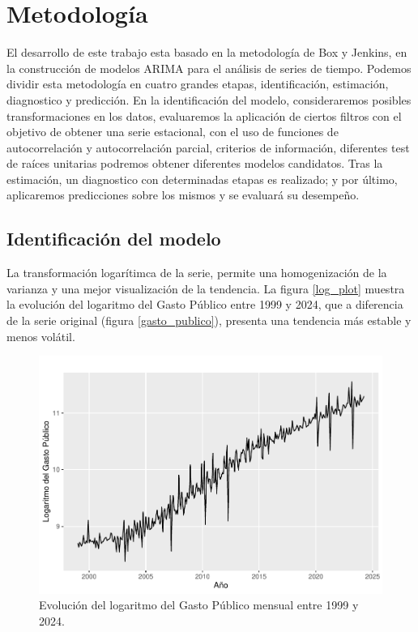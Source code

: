 \documentclass[
  12pt,
]{article}
\begin{document}
\hypertarget{metodologia}{%
\section{Metodología}\label{metodologia}}

El desarrollo de este trabajo esta basado en la metodología de Box y
Jenkins, en la construcción de modelos ARIMA para el análisis de series
de tiempo. Podemos dividir esta metodología en cuatro grandes etapas,
identificación, estimación, diagnostico y predicción. En la
identificación del modelo, consideraremos posibles transformaciones en
los datos, evaluaremos la aplicación de ciertos filtros con el objetivo
de obtener una serie estacional, con el uso de funciones de
autocorrelación y autocorrelación parcial, criterios de información,
diferentes test de raíces unitarias podremos obtener diferentes modelos
candidatos. Tras la estimación, un diagnostico con determinadas etapas
es realizado; y por último, aplicaremos predicciones sobre los mismos y
se evaluará su desempeño.

\hypertarget{identificaciuxf3n-del-modelo}{%
\subsection{Identificación del
modelo}\label{identificaciuxf3n-del-modelo}}

La transformación logarítimca de la serie, permite una homogenización de
la varianza y una mejor visualización de la tendencia. La figura
\ref{log_plot} muestra la evolución del logaritmo del Gasto Público
entre 1999 y 2024, que a diferencia de la serie original (figura
\ref{gasto_publico}), presenta una tendencia más estable y menos
volátil.

\begin{figure}[H]

{\centering \includegraphics[width=0.75\linewidth]{informe_files/figure-latex/log_plot-1} 

}

\caption{\label{log_plot} Evolución del logaritmo del Gasto Público mensual entre 1999 y 2024.}\label{fig:log_plot}
\end{figure}
\end{document}
